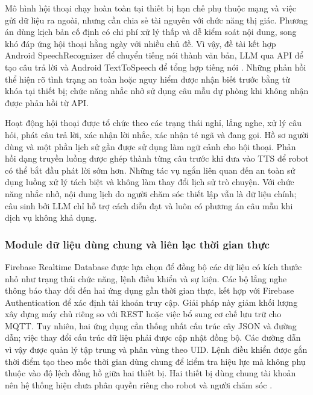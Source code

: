 Mô hình hội thoại chạy hoàn toàn tại thiết bị hạn chế phụ thuộc mạng và việc gửi dữ liệu ra ngoài, nhưng cần chia sẻ tài nguyên với chức năng thị giác. Phương án dùng kịch bản cố định có chi phí xử lý thấp và dễ kiểm soát nội dung, song khó đáp ứng hội thoại hằng ngày với nhiều chủ đề. Vì vậy, đề tài kết hợp Android SpeechRecognizer để chuyển tiếng nói thành văn bản, LLM qua API để tạo câu trả lời và Android TextToSpeech để tổng hợp tiếng nói . Những phản hồi thể hiện rõ tình trạng an toàn hoặc nguy hiểm được nhận biết trước bằng từ khóa tại thiết bị; chức năng nhắc nhở sử dụng câu mẫu dự phòng khi không nhận được phản hồi từ API.

Hoạt động hội thoại được tổ chức theo các trạng thái nghỉ, lắng nghe, xử lý câu hỏi, phát câu trả lời, xác nhận lời nhắc, xác nhận té ngã và đang gọi. Hồ sơ người dùng và một phần lịch sử gần được sử dụng làm ngữ cảnh cho hội thoại. Phản hồi dạng truyền luồng được ghép thành từng câu trước khi đưa vào TTS để robot có thể bắt đầu phát lời sớm hơn. Những tác vụ ngắn liên quan đến an toàn sử dụng luồng xử lý tách biệt và không làm thay đổi lịch sử trò chuyện. Với chức năng nhắc nhở, nội dung lịch do người chăm sóc thiết lập vẫn là dữ liệu chính; câu sinh bởi LLM chỉ hỗ trợ cách diễn đạt và luôn có phương án câu mẫu khi dịch vụ không khả dụng.

\subsubsection{Module dữ liệu dùng chung và liên lạc thời gian thực}

Firebase Realtime Database được lựa chọn để đồng bộ các dữ liệu có kích thước nhỏ như trạng thái chức năng, lệnh điều khiển và sự kiện. Các bộ lắng nghe thông báo thay đổi đến hai ứng dụng gần thời gian thực, kết hợp với Firebase Authentication để xác định tài khoản truy cập. Giải pháp này giảm khối lượng xây dựng máy chủ riêng so với REST hoặc việc bổ sung cơ chế lưu trữ cho MQTT. Tuy nhiên, hai ứng dụng cần thống nhất cấu trúc cây JSON và đường dẫn; việc thay đổi cấu trúc dữ liệu phải được cập nhật đồng bộ. Các đường dẫn vì vậy được quản lý tập trung và phân vùng theo UID. Lệnh điều khiển được gắn thời điểm tạo theo mốc thời gian dùng chung để kiểm tra hiệu lực mà không phụ thuộc vào độ lệch đồng hồ giữa hai thiết bị. Hai thiết bị dùng chung tài khoản nên hệ thống hiện chưa phân quyền riêng cho robot và người chăm sóc .

